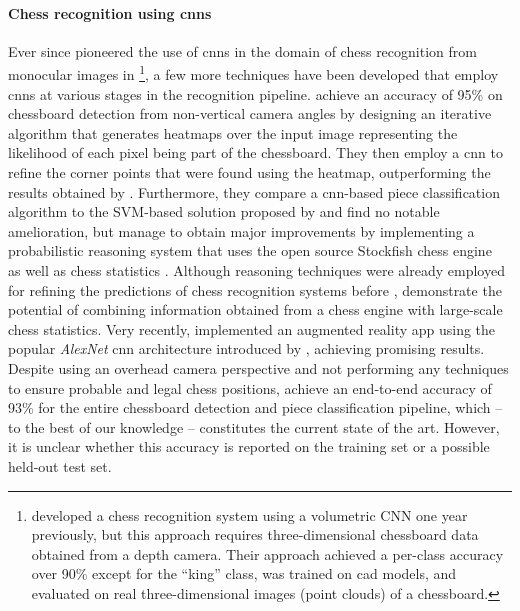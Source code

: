 \paragraph{Chess recognition using \glspl{cnn}}
Ever since \citeauthor{xie2018} pioneered the use of \glspl{cnn} in the domain of chess recognition from monocular images in \citeyear{xie2018}%
\footnote{%
    \textcite{wei2017} developed a chess recognition system using a volumetric CNN one year previously, but this approach requires three-dimensional chessboard data obtained from a depth camera. 
    Their approach achieved a per-class accuracy over 90\% except for the ``king'' class, was trained on \gls{cad} models, and evaluated on real three-dimensional images (point clouds) of a chessboard.
},
a few more techniques have been developed that employ \glspl{cnn} at various stages in the recognition pipeline.
\textcite{czyzewski2020} achieve an accuracy of 95\% on chessboard detection from non-vertical camera angles by designing an iterative algorithm that generates heatmaps over the input image representing the likelihood of each pixel being part of the chessboard. 
They then employ a \gls{cnn} to refine the corner points that were found using the heatmap, outperforming the results obtained by \textcite{goncalves2005}.
Furthermore, they compare a \gls{cnn}-based piece classification algorithm to the SVM-based solution proposed by \textcite{ding2016} and find no notable amelioration, but manage to obtain major improvements by implementing a probabilistic reasoning system that uses the open source Stockfish chess engine \cite{romstad2020} as well as chess statistics \cite{acher2016}.
Although reasoning techniques were already employed for refining the predictions of chess recognition systems before \cite{neufeld2010,danner2015}, \citeauthor{czyzewski2020} demonstrate the potential of combining information obtained from a chess engine with large-scale chess statistics.  
Very recently, \textcite{mehta2020} implemented an augmented reality app using the popular \emph{AlexNet} \gls{cnn} architecture introduced by \textcite{krizhevsky2017}, achieving promising results.
Despite using an overhead camera perspective and not performing any techniques to ensure probable and legal chess positions, \citeauthor{mehta2020} achieve an end-to-end accuracy of 93\% for the entire chessboard detection and piece classification pipeline, which -- to the best of our knowledge -- constitutes the current state of the art.
However, it is unclear whether this accuracy is reported on the training set or a possible held-out test set.

